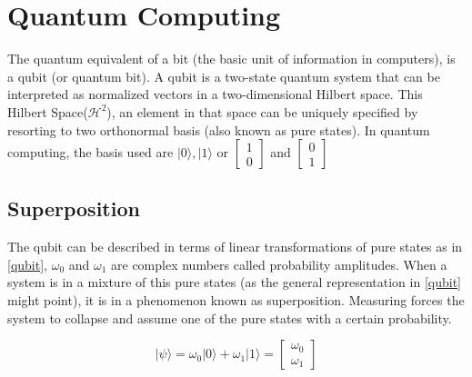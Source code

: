 


\section{Quantum Computing}
\label{sec:int_quantum_computing}





The quantum equivalent of a bit (the basic unit of information in computers), is a qubit (or quantum bit). A qubit is a two-state quantum system that can be interpreted as normalized vectors in a two-dimensional Hilbert space. This Hilbert Space($\mathcal{H}^2$), an element in that space can be uniquely specified by resorting to two orthonormal basis (also known as pure states). In quantum computing, the basis used are ${ \vert 0 \rangle , \vert 1 \rangle }$ or $\left[\begin{array}{c}
1\\
0
\end{array}\right]$
 and 
$\left[\begin{array}{c}
0\\
1
\end{array}\right]$ 

\subsection{Superposition}
\label{subsec:superposition}

The qubit can be described in terms of linear transformations of pure states as in \ref{qubit}, $\omega_{0}$ and $\omega_{1}$ are complex numbers called probability amplitudes. When a system is in a mixture of this pure states (as the general representation in \ref{qubit} might point), it is in a phenomenon known as superposition. Measuring forces the system to collapse and assume one of the pure states with a certain probability. 

\begin{equation}
\label{qubit}
\vert \psi \rangle = \omega_{0}\vert0\rangle+\omega_{1}\vert1\rangle = \left[\begin{array}{c}
\omega_{0}\\
\omega_{1}
\end{array}\right]
\end{equation}

